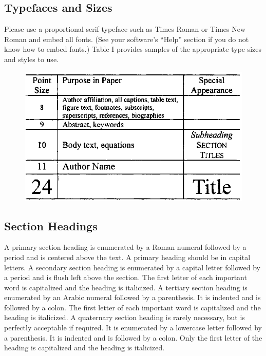 \documentclass[a4paper]{IEEEtran}
\begin{document}
\subsection{Typefaces and Sizes}
Please use a proportional serif typeface such as Times Roman or Times New Roman and embed all fonts. (See your software’s “Help” section if you do not know how to embed fonts.) 
Table I provides samples of the appropriate type sizes and styles to use.
%
\begin{table}[H]
\caption{Samples of Times Roman Type Sizes and Styles Used for Formatting a ICEM  Technical Work.\label{tab:Comparison-of-pattern}}
\begin{figure}[H]
\begin{centering}
\includegraphics[scale=.9]{img2}
\par\end{centering}
\end{figure}


\end{table}

\subsection{Section Headings}
A primary section heading is enumerated by a Roman numeral followed by a period and is centered above the text. A primary heading should be in capital letters.
A secondary section heading is enumerated by a capital letter followed by a period and is flush left above the section. The first letter of each important word is capitalized and the heading is italicized.
A tertiary section heading is enumerated by an Arabic numeral followed by a parenthesis. It is indented and is followed by a colon. The first letter of each important word is capitalized and the heading is italicized.
A quaternary section heading is rarely necessary, but is perfectly acceptable if required. It is enumerated by a lowercase letter followed by a parenthesis. It is indented and is followed by a colon. Only the first letter of the heading is capitalized and the heading is italicized.
\end{document}
